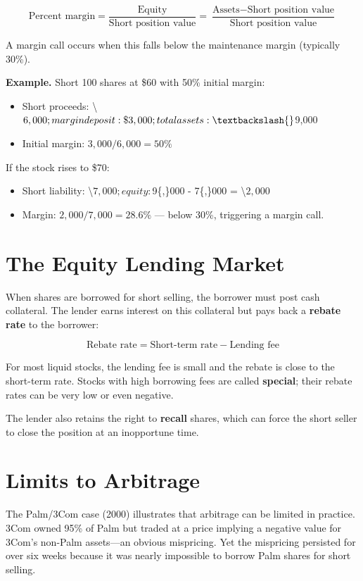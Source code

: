 \documentclass[11pt,letterpaper]{report}
\begin{document}
$$\text{Percent margin} = \frac{\text{Equity}}{\text{Short position value}} = \frac{\text{Assets} - \text{Short position value}}{\text{Short position value}}$$

A margin call occurs when this falls below the maintenance margin (typically 30\%).

\textbf{Example.}  Short 100 shares at \$60 with 50\% initial margin:

\begin{itemize}
  \item Short proceeds: \textbackslash{}$6,000; margin deposit: \$3,000; total assets: \textbackslash{}$9,000
  \item Initial margin: $3{,}000 / 6{,}000 = 50\%$
\end{itemize}

If the stock rises to \$70:
\begin{itemize}
  \item Short liability: \textbackslash{}$7,000; equity: $9\{,\}000 - 7\{,\}000 = \textbackslash{}$2{,}000$
  \item Margin: $2{,}000 / 7{,}000 = 28.6\%$ --- below 30\%, triggering a margin call.
\end{itemize}

\section{The Equity Lending Market}


When shares are borrowed for short selling, the borrower must post cash collateral.  The lender earns interest on this collateral but pays back a \textbf{rebate rate} to the borrower:

$$\text{Rebate rate} = \text{Short-term rate} - \text{Lending fee}$$

For most liquid stocks, the lending fee is small and the rebate is close to the short-term rate.  Stocks with high borrowing fees are called \textbf{special}; their rebate rates can be very low or even negative.

The lender also retains the right to \textbf{recall} shares, which can force the short seller to close the position at an inopportune time.

\section{Limits to Arbitrage}


The Palm/3Com case (2000) illustrates that arbitrage can be limited in practice.  3Com owned 95\% of Palm but traded at a price implying a negative value for 3Com's non-Palm assets---an obvious mispricing.  Yet the mispricing persisted for over six weeks because it was nearly impossible to borrow Palm shares for short selling.
\end{document}
